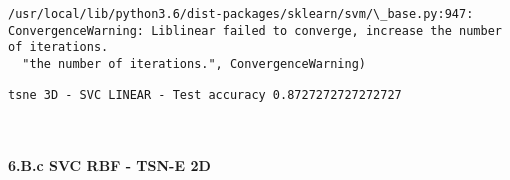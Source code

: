 \documentclass[11pt]{article}
\begin{document}
    \begin{Verbatim}[commandchars=\\\{\}]
/usr/local/lib/python3.6/dist-packages/sklearn/svm/\_base.py:947: ConvergenceWarning: Liblinear failed to converge, increase the number of iterations.
  "the number of iterations.", ConvergenceWarning)

    \end{Verbatim}

    \begin{Verbatim}[commandchars=\\\{\}]
tsne 3D - SVC LINEAR - Test accuracy 0.8727272727272727

    \end{Verbatim}

    \begin{center}
    \end{center}
    { \hspace*{\fill} \\}
    
    \hypertarget{b.c-svc-rbf---tsn-e-2d}{%
\paragraph{6.B.c SVC RBF - TSN-E 2D}\label{b.c-svc-rbf---tsn-e-2d}}
\end{document}
